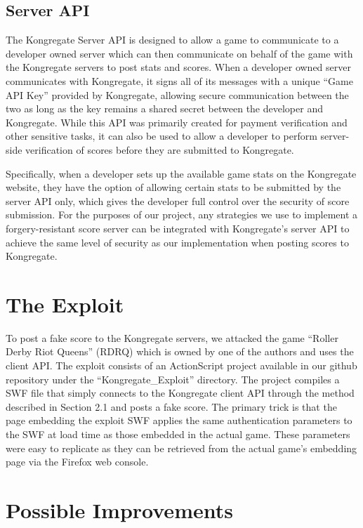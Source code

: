 \documentclass [11pt] {article}
\begin{document}
\subsection {Server API} 

The Kongregate Server API is designed to allow a game to communicate to a developer owned server which can then communicate on behalf of the game with the Kongregate servers to post stats and scores. When a developer owned server communicates with Kongregate, it signs all of its messages with a unique ``Game API Key'' provided by Kongregate, allowing secure communication between the two as long as the key remains a shared secret between the developer and Kongregate. While this API was primarily created for payment verification and other sensitive tasks, it can also be used to allow a developer to perform server-side verification of scores before they are submitted to Kongregate. 

Specifically, when a developer sets up the available game stats on the Kongregate website, they have the option of allowing certain stats to be submitted by the server API only, which gives the developer full control over the security of score submission. For the purposes of our project, any strategies we use to implement a forgery-resistant score server can be integrated with Kongregate's server API to achieve the same level of security as our implementation when posting scores to Kongregate. 

\section { The Exploit }

To post a fake score to the Kongregate servers, we attacked the game ``Roller Derby Riot Queens'' (RDRQ) which is owned by one of the authors and uses the client API. The exploit consists of an ActionScript project available in our github repository under the ``Kongregate\_Exploit'' directory. The project compiles a SWF file that simply connects to the Kongregate client API through the method described in Section 2.1 and posts a fake score. The primary trick is that the page embedding the exploit SWF applies the same authentication parameters to the SWF at load time as those embedded in the actual game. These parameters were easy to replicate as they can be retrieved from the actual game's embedding page via the Firefox web console. 

\section { Possible Improvements } 
\end{document}

